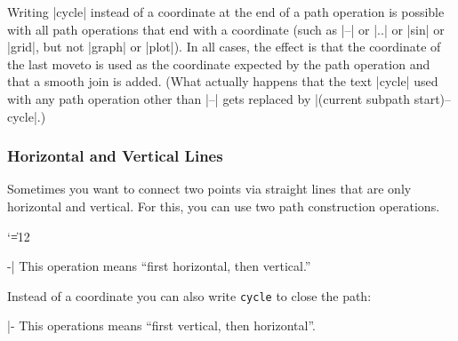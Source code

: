 Writing |cycle| instead of a coordinate at the end of a path operation is
possible with all path operations that end with a coordinate (such as |--| or
|..| or |sin| or |grid|, but not |graph| or |plot|). In all cases, the effect
is that the coordinate of the last moveto is used as the coordinate expected by
the path operation and that a smooth join is added. (What actually happens that
the text |cycle| used with any path operation other than |--| gets replaced by
|(current subpath start)--cycle|.)


\subsubsection{Horizontal and Vertical Lines}

Sometimes you want to connect two points via straight lines that are only
horizontal and vertical. For this, you can use two path construction
operations.

{\catcode`\|=12
\begin{pathoperation}[noindex]{-|}{}
    \pgfmanualpdflabel[\catcode`\|=12 ]{-|}{}%
    This operation means ``first horizontal, then vertical.''
\begin{codeexample}[]
\end{codeexample}
    Instead of a coordinate you can also write \verb!cycle! to close the path:
\begin{codeexample}[]
\end{codeexample}
\end{pathoperation}

\begin{pathoperation}[noindex]{|-}{}
    \pgfmanualpdflabel[\catcode`\|=12 ]{|-}{}%
    This operations means ``first vertical, then horizontal''.
\end{pathoperation}
}



